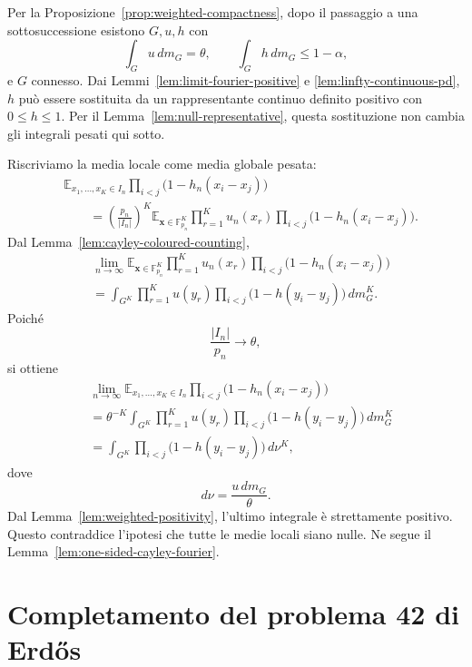 \documentclass[11pt]{article}
\numberwithin{equation}{section}
\newcommand{\E}{\mathbb E}
\newcommand{\F}{\mathbb F}
\newcommand{\1}{\mathbf 1}
\begin{document}
Per la Proposizione~\ref{prop:weighted-compactness}, dopo il passaggio a una sottosuccessione esistono \(G,u,h\) con
\[
        \int_G u\,dm_G=\theta,
        \qquad
        \int_G h\,dm_G\le1-\alpha,
\]
e \(G\) connesso. Dai Lemmi~\ref{lem:limit-fourier-positive} e \ref{lem:linfty-continuous-pd}, \(h\) può essere sostituita da un rappresentante continuo definito positivo con \(0\le h\le1\). Per il Lemma~\ref{lem:null-representative}, questa sostituzione non cambia gli integrali pesati qui sotto.

Riscriviamo la media locale come media globale pesata:
\[
\begin{aligned}
&\E_{x_1,\ldots,x_K\in I_n}
        \prod_{i<j}
        \bigl(1-h_n(x_i-x_j)\bigr)                              \\
&\qquad =
\left(\frac{p_n}{|I_n|}\right)^K
\E_{\mathbf x\in\F_{p_n}^K}
        \prod_{r=1}^K u_n(x_r)
        \prod_{i<j}
        \bigl(1-h_n(x_i-x_j)\bigr).
\end{aligned}
\]
Dal Lemma~\ref{lem:cayley-coloured-counting},
\[
\begin{aligned}
&\lim_{n\to\infty}
\E_{\mathbf x\in\F_{p_n}^K}
        \prod_{r=1}^K u_n(x_r)
        \prod_{i<j}
        \bigl(1-h_n(x_i-x_j)\bigr)                              \\
&=
\int_{G^K}
        \prod_{r=1}^K u(y_r)
        \prod_{i<j}
        \bigl(1-h(y_i-y_j)\bigr)\,dm_G^K.
\end{aligned}
\]
Poiché
\[
        \frac{|I_n|}{p_n}\to\theta,
\]
si ottiene
\[
\begin{aligned}
&\lim_{n\to\infty}
\E_{x_1,\ldots,x_K\in I_n}
        \prod_{i<j}
        \bigl(1-h_n(x_i-x_j)\bigr)                              \\
&=
\theta^{-K}
\int_{G^K}
        \prod_{r=1}^K u(y_r)
        \prod_{i<j}
        \bigl(1-h(y_i-y_j)\bigr)\,dm_G^K                         \\
&=
\int_{G^K}
        \prod_{i<j}
        \bigl(1-h(y_i-y_j)\bigr)\,d\nu^K,
\end{aligned}
\]
dove
\[
        d\nu=\frac{u\,dm_G}{\theta}.
\]
Dal Lemma~\ref{lem:weighted-positivity}, l'ultimo integrale è strettamente positivo. Questo contraddice l'ipotesi che tutte le medie locali siano nulle. Ne segue il Lemma~\ref{lem:one-sided-cayley-fourier}.

\section{Completamento del problema 42 di Erd\H{o}s}
\end{document}
